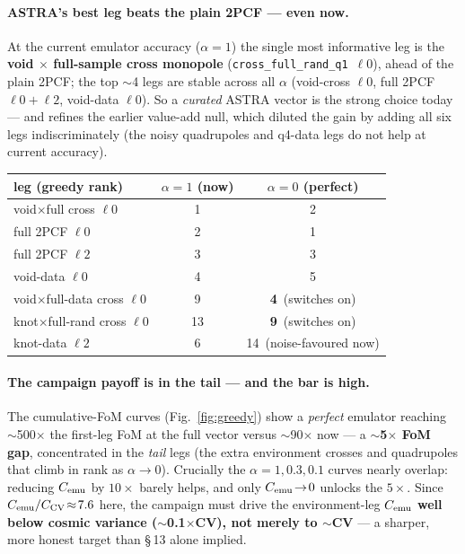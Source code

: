 \documentclass[11pt]{article}
\newcommand{\code}[1]{\texttt{#1}}
\begin{document}
\paragraph{ASTRA's best leg beats the plain 2PCF --- even now.} At the current emulator
accuracy ($\alpha=1$) the single most informative leg is the \textbf{void $\times$
full-sample cross monopole} (\code{cross\_full\_rand\_q1}~$\ell0$), ahead of the plain
2PCF; the top $\sim$4 legs are stable across all $\alpha$ (void-cross $\ell0$, full
2PCF $\ell0{+}\ell2$, void-data $\ell0$). So a \emph{curated} ASTRA vector is the
strong choice today --- and refines the earlier value-add null, which diluted the gain
by adding all six legs indiscriminately (the noisy quadrupoles and q4-data legs do not
help at current accuracy).

\begin{center}\small
\begin{tabular}{lcc}
\toprule
leg (greedy rank) & $\alpha=1$ (now) & $\alpha=0$ (perfect)\\
\midrule
void$\times$full cross $\ell0$ & 1 & 2\\
full 2PCF $\ell0$              & 2 & 1\\
full 2PCF $\ell2$              & 3 & 3\\
void-data $\ell0$             & 4 & 5\\
void$\times$full-data cross $\ell0$ & 9 & \textbf{4}\ (switches on)\\
knot$\times$full-rand cross $\ell0$ & 13 & \textbf{9}\ (switches on)\\
knot-data $\ell2$            & 6 & 14\ (noise-favoured now)\\
\bottomrule
\end{tabular}
\end{center}

\paragraph{The campaign payoff is in the tail --- and the bar is high.} The
cumulative-FoM curves (Fig.~\ref{fig:greedy}) show a \emph{perfect} emulator reaching
$\sim$500$\times$ the first-leg FoM at the full vector versus $\sim$90$\times$ now ---
a \textbf{$\sim$5$\times$ FoM gap}, concentrated in the \emph{tail} legs (the extra
environment crosses and quadrupoles that climb in rank as $\alpha\to0$). Crucially the
$\alpha=1,0.3,0.1$ curves nearly overlap: reducing $C_{\rm emu}$ by $10\times$ barely
helps, and only $C_{\rm emu}\!\to\!0$ unlocks the $5\times$. Since
$C_{\rm emu}/C_{\rm CV}\!\approx\!7.6$ here, the campaign must drive the environment-leg
$C_{\rm emu}$ \textbf{well below cosmic variance ($\sim$0.1$\times$CV), not merely to
$\sim$CV} --- a sharper, more honest target than \S\,13 alone implied.
\end{document}
